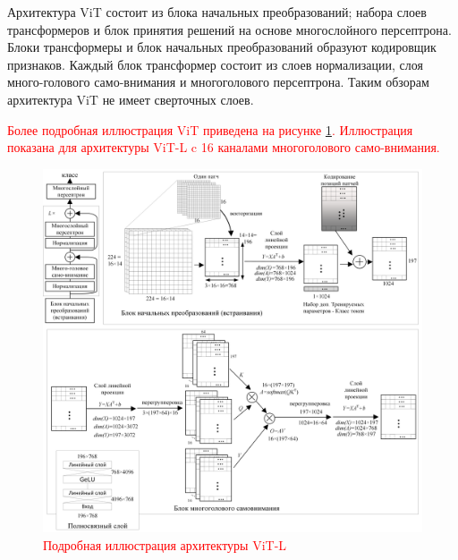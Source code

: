 \documentclass[12pt]{article}
\begin{document}
\begin{sloppypar}
Архитектура ViT состоит из блока начальных преобразований; набора слоев трансформеров и блок принятия решений на основе многослойного персептрона. Блоки трансформеры и блок начальных преобразований образуют кодировщик признаков. Каждый блок трансформер состоит из слоев нормализации, слоя много-голового само-внимания и многоголового персептрона. Таким обзорам архитектура ViT не имеет сверточных слоев. 
\textcolor{red}{
Более подробная иллюстрация ViT приведена на рисунке \ref{ch1:fig:transformer_vit_v2}. Иллюстрация показана для архитектуры ViT-L c 16 каналами многоголового само-внимания.
\begin{figure}[!h]
	\begin{center}
		\includegraphics[width=0.99\linewidth]{./figuresch1/vit_v3.png}
		\caption{Подробная иллюстрация архитектуры ViT-L}	
		\label{ch1:fig:transformer_vit_v2}
	\end{center}
\end{figure}
}

\end{sloppypar}
\end{document}
